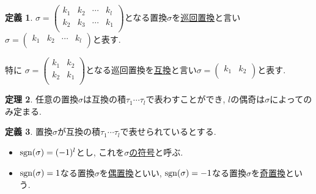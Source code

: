 \documentclass[dvipdfmx,a4paper,11pt]{article}
\newcommand{\sgn}{{\rm sgn}}
\theoremstyle{definition}
\newtheorem{thm}{定理}
\newtheorem{dfn}[thm]{定義}
\begin{document}
\begin{tcolorbox}[
    colback = white,
    colframe = green!35!black,
    fonttitle = \bfseries,
    breakable = true]
    \begin{dfn}
 $ \sigma =
  \begin{pmatrix}
 k_1& k_2  &\cdots &k_l\\
 k_2& k_3  &\cdots &k_1\\
 \end{pmatrix} 
$となる置換$\sigma$を\underline{巡回置換}と言い
$\sigma =
  \begin{pmatrix}
 k_1& k_2  &\cdots &k_l\\
 \end{pmatrix} 
$と表す.

特に $ \sigma =
  \begin{pmatrix}
 k_1& k_2  \\
 k_2& k_1 \\
 \end{pmatrix} 
$となる巡回置換を\underline{互換}と言い$\sigma =
  \begin{pmatrix}
 k_1& k_2 \\
 \end{pmatrix} 
$と表す.
  \end{dfn}
 \end{tcolorbox}


\begin{tcolorbox}[
    colback = white,
    colframe = green!35!black,
    fonttitle = \bfseries,
    breakable = true]
    \begin{thm}
任意の置換$\sigma$は互換の積$\tau_1 \cdots \tau_{l}$で表わすことができ, $l$の偶奇は$\sigma$によってのみ定まる.
  \end{thm}
 \end{tcolorbox}
 
 \begin{tcolorbox}[
    colback = white,
    colframe = green!35!black,
    fonttitle = \bfseries,
    breakable = true]
    \begin{dfn}
置換$\sigma$が互換の積$\tau_1 \cdots \tau_{l}$で表せられているとする.
\begin{itemize}
\item $\sgn (\sigma) = (-1)^{l}$とし, これを\underline{$\sigma$の符号}と呼ぶ.
\item $\sgn (\sigma) = 1$なる置換$\sigma$を\underline{偶置換}といい, $\sgn (\sigma) = -1$なる置換$\sigma$を\underline{奇置換}という.
\end{itemize}
  \end{dfn}
 \end{tcolorbox}
 
\end{document}
